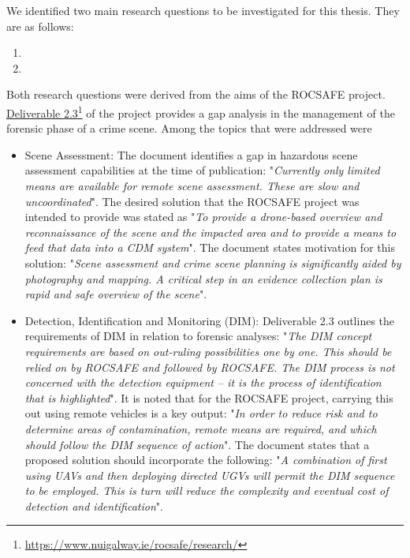 We identified two main research questions to be investigated for this thesis. They are as follows:
\begin{enumerate}

    \item  
    
    \item 
    
\end{enumerate}

Both research questions were derived from the aims of the ROCSAFE project. \href{https://www.nuigalway.ie/rocsafe/research/}{Deliverable 2.3}\footnote{\href {https://www.nuigalway.ie/rocsafe/research/}{https://www.nuigalway.ie/rocsafe/research/}} of the project provides a gap analysis in the management of the forensic phase of a crime scene. 
Among the topics that were addressed were
\begin{itemize}
    \item Scene Assessment: The document identifies a gap in hazardous scene assessment capabilities at the time of publication: 
"\textit{Currently only limited means are available for remote scene assessment. These are slow and uncoordinated}". The desired solution that the ROCSAFE project was intended to provide was stated as "\textit{To provide a drone-based overview and reconnaissance of the scene and the impacted area and to provide a means to feed that data into a CDM system}". The document states motivation for this solution: "\textit{Scene assessment and crime scene planning is significantly aided by photography and mapping.  A critical step in an evidence collection plan is rapid and safe overview of the scene}".

    \item Detection, Identification and Monitoring (DIM): Deliverable 2.3 outlines the requirements of DIM in relation to forensic analyses:
    "\textit{The DIM concept requirements are based on out-ruling possibilities one by one. This should be relied on by ROCSAFE and followed by ROCSAFE. The DIM process is not concerned with the detection equipment – it is the process of identification that is highlighted}". It is noted that for the ROCSAFE project, carrying this out using remote vehicles is a key output: "\textit{In order to reduce risk and to determine areas of contamination, remote means are required, and which should follow the DIM sequence of action}". The document states that a proposed solution should incorporate the following: "\textit{A combination of first using UAVs and then deploying directed UGVs will permit the DIM sequence to be employed. This is turn will reduce the complexity and eventual cost of detection and identification}".
\end{itemize}

